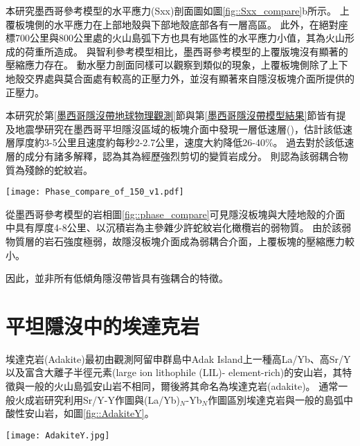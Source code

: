 本研究墨西哥參考模型的水平應力(Sxx)剖面圖如圖\ref{fig::Sxx_compare}b所示。
上覆板塊側的水平應力在上部地殼與下部地殼底部各有一層高區。
此外，在絕對座標700公里與800公里處的火山島弧下方也具有地區性的水平應力小值，其為火山形成的荷重所造成。
與智利參考模型相比，墨西哥參考模型的上覆版塊沒有顯著的壓縮應力存在。
動水壓力剖面同樣可以觀察到類似的現象，上覆板塊側除了上下地殼交界處與莫合面處有較高的正壓力外，並沒有顯著來自隱沒板塊介面所提供的正壓力。

本研究於第\ref{墨西哥隱沒帶地球物理觀測}節與第\ref{墨西哥隱沒帶模型結果}節皆有提及地震學研究在墨西哥平坦隱沒區域的板塊介面中發現一層低速層(\citealp{PerezCampos2008})，\citealp{Song2009}估計該低速層厚度約3-5公里且速度約每秒2-2.7公里，速度大約降低26-40$\%$。
過去對於該低速層的成分有諸多解釋，\citealp{Song2012SC}認為其為經歷強烈剪切的變質岩成分。
\citealp{Manea2017}則認為該弱耦合物質為殘餘的蛇紋岩。

\begin{figure*}[h]
    \centering
    \texttt{[image: Phase\_compare\_of\_150\_v1.pdf]}
    \caption[參考模型中於30 Myr的岩相剖面]{參考模型中於30 Myr的岩相剖面。}
    \label{fig::phase_compare}
\end{figure*}

從墨西哥參考模型的岩相圖\ref{fig::phase_compare}可見隱沒板塊與大陸地殼的介面中具有厚度4-8公里、以沉積岩為主參雜少許蛇紋岩化橄欖岩的弱物質。
由於該弱物質層的岩石強度極弱，故隱沒板塊介面成為弱耦合介面，上覆板塊的壓縮應力較小。

因此，並非所有低傾角隱沒帶皆具有強耦合的特徵。

\section{平坦隱沒中的埃達克岩}\label{平坦隱沒中的埃達克岩}
埃達克岩(Adakite)最初由\citealp{kay1978aleutian}觀測阿留申群島中Adak Island上一種高La/Yb、高Sr/Y以及富含大離子半徑元素(large ion
lithophile (LIL)- element-rich)的安山岩，其特徵與一般的火山島弧安山岩不相同，爾後\citealp{defant1990derivation}將其命名為埃達克岩(adakite)。
通常一般火成岩研究利用Sr/Y-Y作圖與(La/Yb)$_N$-Yb$_N$作圖區別埃達克岩與一般的島弧中酸性安山岩，如圖\ref{fig::AdakiteY}。

\begin{figure*}[h]
    \centering
    \texttt{[image: AdakiteY.jpg]}
    \caption[Sr/Y-Y作圖與(La/Yb)$_N$-Yb$_N$作圖]{(A)Sr/Y-Y作圖與(B)(La/Yb)$_N$-Yb$_N$作圖，摘自\citealp{castillo2012adakite}。通常用於區分埃達克岩與普通島弧安山岩、石英岩與流紋岩(normal arc andesite, dacite and rhyolite, ADR)。紫色實線邊界來自於\citealp{richards2007special}所提出菲律賓中南部埃達克岩與普通島弧安山岩的資料。}
    \label{fig::AdakiteY}
\end{figure*}

